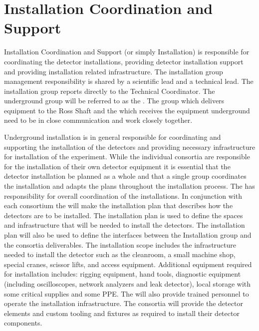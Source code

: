\section{Installation Coordination and Support}
\label{sec:fdsp-coord-install}


Installation Coordination and Support (or simply Installation) is
responsible for coordinating the detector installations, providing
detector installation support and providing installation related
infrastructure. The installation group management responsibility is
shared by a scientific lead and a technical lead. The installation
group reports directly to the Technical Coordinator. The underground
group will be referred to as the . The  group which delivers equipment to the Ross
Shaft and the  which receives the equipment underground need to be
in close communication and work closely together.

Underground installation is in general responsible for coordinating
and supporting the installation of the detectors and providing
necessary infrastructure for installation of the experiment. While the individual
consortia are responsible for the installation of their own detector
equipment it is essential that the detector installation be planned
as a whole and that a single group coordinates the installation and
adapts the plans throughout the installation process. The  has 
responsibility for overall coordination of the installations. In
conjunction with each consortium the  will make the installation
plan that describes how the detectors are to be installed. The
installation plan is used to define the spaces and infrastructure that
will be needed to install the detectors. The installation plan will
also be used to define the interfaces between the Installation group
and the consortia deliverables.  The installation scope includes the
infrastructure needed to install the detector such as the cleanroom, a
small machine shop, special cranes, scissor lifts, and access equipment.
Additional equipment required for installation includes: rigging equipment, hand tools, diagnostic equipment
(including oscilloscopes, network analyzers and leak detector), local storage with some critical supplies and some PPE. The  will also provide trained personnel to operate the installation
infrastructure. The consortia will provide the detector elements and
custom tooling and fixtures as required to install their detector
components.

